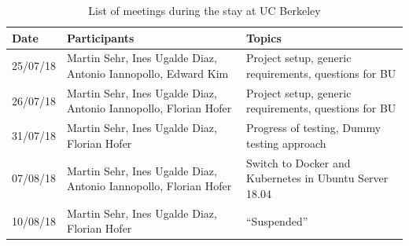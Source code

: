 \documentclass[]{scrartcl}
\begin{document}
\begin{table}[H]
	\centering
	\caption{List of meetings during the stay at UC Berkeley}
	
	\begin{tabular}{l p{5cm} p{5cm}}
	Date & Participants & Topics \\
	\hline
	25/07/18 & Martin Sehr, Ines Ugalde Diaz, Antonio Iannopollo, Edward Kim & Project setup, generic requirements, questions for BU\\
	26/07/18 & Martin Sehr, Ines Ugalde Diaz, Antonio Iannopollo, Florian Hofer & Project setup, generic requirements, questions for BU\\
	31/07/18 & Martin Sehr, Ines Ugalde Diaz, Florian Hofer & Progress of testing, Dummy testing approach\\
	07/08/18 & Martin Sehr, Ines Ugalde Diaz, Antonio Iannopollo, Florian Hofer & Switch to Docker and Kubernetes in Ubuntu Server 18.04\\
	10/08/18 & Martin Sehr, Ines Ugalde Diaz, Florian Hofer & ``Suspended''\\
	\hline
	\end{tabular}
	
	\label{tab:meeting}
\end{table}



\end{document}
